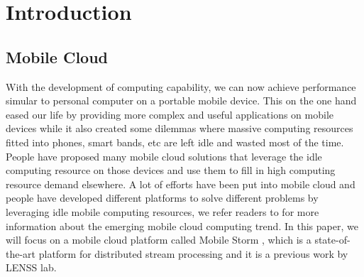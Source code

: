 \documentclass[journal,comsoc]{IEEEtran}
\begin{document}
\section{Introduction}
\subsection{Mobile Cloud}
With the development of computing capability, we can now achieve performance simular to personal computer on a portable mobile device. This on the one hand eased our life by providing more complex and useful applications on mobile devices while it also created some dilemmas where massive computing resources fitted into phones, smart bands, etc are left idle and wasted most of the time. People have proposed many mobile cloud solutions that leverage the idle computing resource on those devices and use them to fill in high computing resource demand elsewhere. A lot of efforts have been put into mobile cloud and people have developed different platforms to solve different problems by leveraging idle mobile computing resources, we refer readers to \cite{kumar2010cloud} \cite{dinh2013survey} \cite{fernando2013mobile} for more information about the emerging mobile cloud computing trend. In this paper, we will focus on a mobile cloud platform called Mobile Storm \cite{ning2015mobile}, which is a state-of-the-art platform for distributed stream processing and it is a previous work by LENSS lab.
\end{document}
